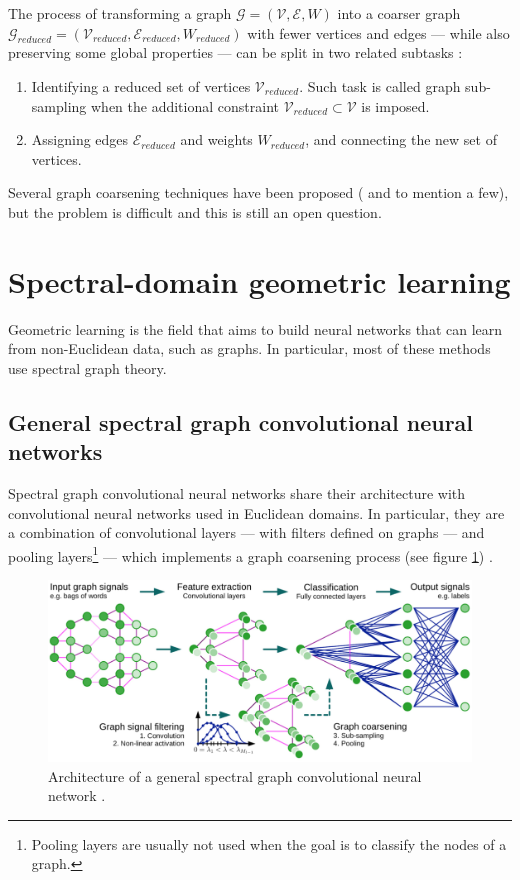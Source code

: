             The process of transforming a graph \(\mathcal{G} = \left(\mathcal{V}, \mathcal{E}, W\right)\) into a coarser graph \(\mathcal{G}_{reduced} = \left(\mathcal{V}_{reduced}, \mathcal{E}_{reduced}, W_{reduced}\right)\) with fewer vertices and edges --- while also preserving some global properties --- can be split in two related subtasks \cite{Shuman}:
            \begin{enumerate}
                \item Identifying a reduced set of vertices \(\mathcal{V}_{reduced}\). Such task is called graph sub-sampling when the additional constraint \(\mathcal{V}_{reduced} \subset \mathcal{V}\) is imposed.
                \item Assigning edges \(\mathcal{E}_{reduced}\) and weights \(W_{reduced}\), and connecting the new set of vertices.
            \end{enumerate}
            Several graph coarsening techniques have been proposed (\cite{Lafon} and \cite{Defferrard} to mention a few), but the problem is difficult and this is still an open question.
    \section{Spectral-domain geometric learning}\label{spectralgeometriclearning}
        Geometric learning is the field that aims to build neural networks that can learn from non-Euclidean data, such as graphs. In particular, most of these methods use spectral graph theory.
        \subsection{General spectral graph convolutional neural networks}
            Spectral graph convolutional neural networks share their architecture with convolutional neural networks used in Euclidean domains. In particular, they are a combination of convolutional layers --- with filters defined on graphs --- and pooling layers\footnote{Pooling layers are usually not used when the goal is to classify the nodes of a graph.} --- which implements a graph coarsening process (see figure \ref{architecture_CNN_graphs}) \cite{Defferrard}.
            
            \begin{figure}
                \centering
                \includegraphics[width=\textwidth]{images/architecture_CNN_graphs.PNG}
                \caption{Architecture of a general spectral graph convolutional neural network \cite{Defferrard}.}
                \label{architecture_CNN_graphs}
            \end{figure}
            
